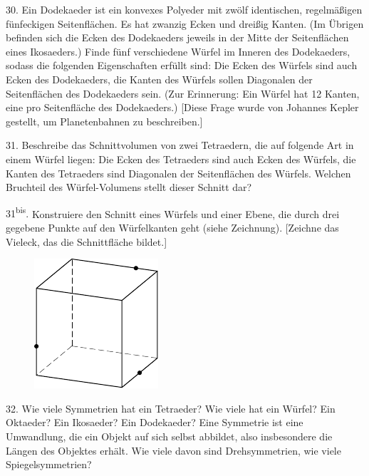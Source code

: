 \begin{problem}{30.}
	Ein Dodekaeder ist ein konvexes Polyeder mit zwölf identischen, regelmäßigen fünfeckigen Seitenflächen. Es hat zwanzig Ecken und dreißig Kanten. (Im Übrigen befinden sich die Ecken des Dodekaeders jeweils in der Mitte der Seitenflächen eines Ikosaeders.)
	Finde fünf verschiedene Würfel im Inneren des Dodekaeders, sodass die folgenden Eigenschaften erfüllt sind: Die Ecken des Würfels sind auch Ecken des Dodekaeders, die Kanten des Würfels sollen Diagonalen der Seitenflächen des Dodekaeders sein. (Zur Erinnerung: Ein Würfel hat 12 Kanten, eine pro Seitenfläche des Dodekaeders.)
	[Diese Frage wurde von Johannes Kepler gestellt, um Planetenbahnen zu beschreiben.]
\end{problem}

\begin{problem}{31.}
	Beschreibe das Schnittvolumen von zwei Tetraedern, die auf folgende Art in einem Würfel liegen: Die Ecken des Tetraeders sind auch Ecken des Würfels, die Kanten des Tetraeders sind Diagonalen der Seitenflächen des Würfels.
	Welchen Bruchteil des Würfel-Volumens stellt dieser Schnitt dar?
\end{problem}

\begin{problem}{31\textsuperscript{bis}.}
	Konstruiere den Schnitt eines Würfels und einer Ebene, die durch drei gegebene Punkte auf den Würfelkanten geht (siehe Zeichnung). [Zeichne das Vieleck, das die Schnittfläche bildet.]
	\begin{figure}
		\includegraphics{resources/taskbook-15}
	\end{figure}
\end{problem}

\begin{problem}{32.}
	Wie viele Symmetrien hat ein Tetraeder? Wie viele hat ein Würfel? Ein Oktaeder? Ein Ikosaeder? Ein Dodekaeder? Eine Symmetrie ist eine Umwandlung, die ein Objekt auf sich selbst abbildet, also insbesondere die Längen des Objektes erhält.
	Wie viele davon sind Drehsymmetrien, wie viele Spiegelsymmetrien?
\end{problem}

